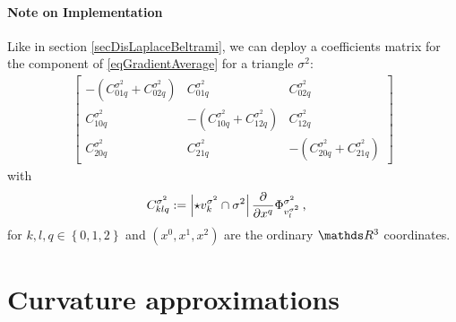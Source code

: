       \paragraph{Note on Implementation}
        Like in section \ref{secDisLaplaceBeltrami}, we can deploy a coefficients matrix for the  component of 
        \eqref{eqGradientAverage} for a triangle \( \sigma^{2} \):
        \begin{align}
            \begin{bmatrix}
              -\left( C^{\sigma^{2}}_{01q} + C^{\sigma^{2}}_{02q}\right) & C^{\sigma^{2}}_{01q} & C^{\sigma^{2}}_{02q} \\
              C^{\sigma^{2}}_{10q} & -\left( C^{\sigma^{2}}_{10q} + C^{\sigma^{2}}_{12q}\right) & C^{\sigma^{2}}_{12q} \\
              C^{\sigma^{2}}_{20q} & C^{\sigma^{2}}_{21q} & -\left( C^{\sigma^{2}}_{20q} + C^{\sigma^{2}}_{21q}\right)
            \end{bmatrix}
        \end{align}
        with 
        \begin{align}
          C^{\sigma^{2}}_{klq} &:= \left| \star v_{k}^{\sigma^{2}} \cap \sigma^{2} \right|
                                   \frac{\partial}{\partial x^{q}} \Phi^{\sigma^{2}}_{v_{l}^{\sigma^{2}}} \,\text{,}
        \end{align}
        for \( k,l,q\in\left\{ 0,1,2 \right\} \) 
        and \( \left( x^{0}, x^{1}, x^{2} \right) \) are the ordinary \( \R^{3} \) coordinates.

        



      
\section{Curvature approximations} \label{secCurvatureApprox}

